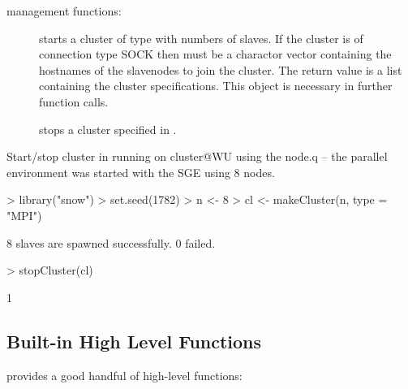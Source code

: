  management functions:

\begin{description}
\item[]
  starts a cluster of type  with  numbers of
  slaves. If the cluster is of connection type SOCK then 
  must be a charactor vector containing the hostnames of the
  slavenodes to join the cluster. The return value is a list
  containing the cluster specifications. This object is necessary in
  further function calls.
\item[] stops a cluster specified in .
\end{description}


\begin{Example} Start/stop cluster in  \newline
running on cluster@WU using the node.q -- the parallel environment was
started with the SGE using 8 nodes.

\begin{Schunk}
\begin{Sinput}
> library("snow")
> set.seed(1782)
> n <- 8
> cl <- makeCluster(n, type = "MPI")
\end{Sinput}
\begin{Soutput}
	8 slaves are spawned successfully. 0 failed.
\end{Soutput}
\begin{Sinput}
> stopCluster(cl)
\end{Sinput}
\begin{Soutput}
[1] 1
\end{Soutput}
\end{Schunk}
\label{ex:snowstartstop}
\end{Example}

\subsection{Built-in High Level Functions}

 provides a good handful of high-level functions: 


